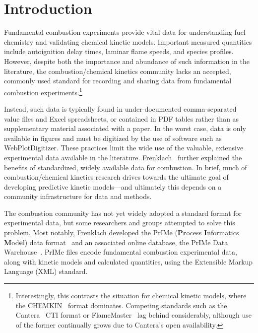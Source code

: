 \documentclass[12pt]{ussci}
\begin{document}
\section{Introduction}
%
Fundamental combustion experiments provide vital data for understanding
fuel chemistry and validating chemical kinetic models. Important measured quantities
include autoignition delay times, laminar flame speeds, and species profiles.
However, despite both the importance and abundance of such information in the literature,
the combustion\slash chemical kinetics community lacks an accepted, commonly used
standard for recording and sharing data from fundamental combustion experiments.\footnote{
Interestingly, this contrasts the situation for chemical kinetic models, where the
CHEMKIN~\autocite{Kee:1996ck} format dominates. Competing standards such as the
Cantera~\autocite{Cantera:2.3.0} CTI format or FlameMaster~\autocite{FlameMaster:ref,FlameMaster:code}
lag behind considerably, although use of the former continually grows due to Cantera's
open availability.
}

Instead, such data is typically found in under-documented
comma-separated value files and Excel spreadsheets, or contained in PDF tables
rather than as supplementary material associated with a paper.
In the worst case, data is only available in figures and must be digitized by the
use of software such as WebPlotDigitizer.
These practices limit the wide use of the valuable, extensive experimental data
available in the literature. Frenklach~\autocite{Frenklach:2007bm} further explained the
benefits of standardized, widely available data for combustion.
In brief, much of combustion\slash chemical kinetics research drives towards the ultimate goal
of developing predictive kinetic models---and ultimately this depends on a community
infrastructure for data and methods.

The combustion community has not yet widely adopted a standard format for experimental data,
but some researchers and groups attempted to solve this problem.
Most notably, Frenklach developed the PrIMe (\textbf{Pr}ocess \textbf{I}nformatics
\textbf{M}od\textbf{e}l) data format~\autocite{Frenklach:2007bm,You:2011hy} and an associated
online database, the PrIMe Data Warehouse~\autocite{PrIMe}. PrIMe files encode fundamental
combustion experimental data, along with kinetic models and calculated quantities,
using the Extensible Markup Language (XML) standard.
\end{document}

